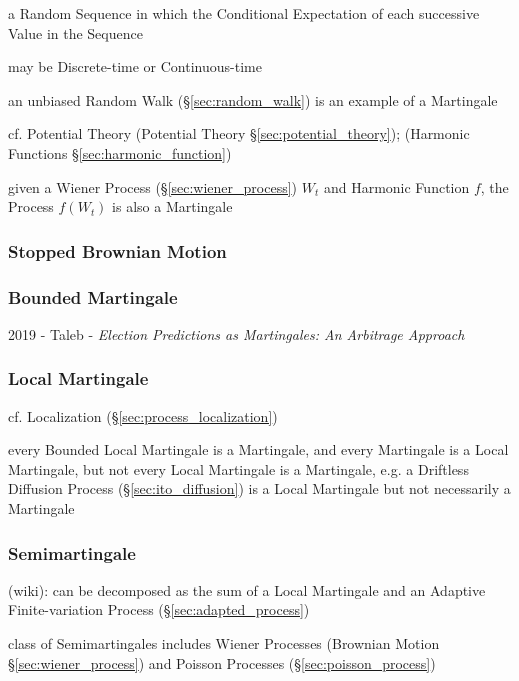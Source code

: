 a Random Sequence in which the Conditional Expectation of each successive Value
in the Sequence

may be Discrete-time or Continuous-time

an unbiased Random Walk (\S\ref{sec:random_walk}) is an example of a Martingale

\fist cf. Potential Theory (Potential Theory \S\ref{sec:potential_theory});
(Harmonic Functions \S\ref{sec:harmonic_function})

given a Wiener Process (\S\ref{sec:wiener_process}) $W_t$ and Harmonic Function
$f$, the Process $f(W_t)$ is also a Martingale



\subsubsection{Stopped Brownian Motion}\label{sec:stopped_brownian_motion}

\subsubsection{Bounded Martingale}\label{sec:bounded_martingale}

2019 - Taleb - \emph{Election Predictions as Martingales: An Arbitrage Approach}



\subsubsection{Local Martingale}\label{sec:local_martingale}

cf. Localization (\S\ref{sec:process_localization})

every Bounded Local Martingale is a Martingale, and every Martingale is a Local
Martingale, but not every Local Martingale is a Martingale, e.g. a Driftless
Diffusion Process (\S\ref{sec:ito_diffusion}) is a Local Martingale but not
necessarily a Martingale



\subsubsection{Semimartingale}\label{sec:semimartingale}

(wiki): can be decomposed as the sum of a Local Martingale and an Adaptive
Finite-variation Process (\S\ref{sec:adapted_process})

class of Semimartingales includes Wiener Processes (Brownian Motion
\S\ref{sec:wiener_process}) and Poisson Processes
(\S\ref{sec:poisson_process})

